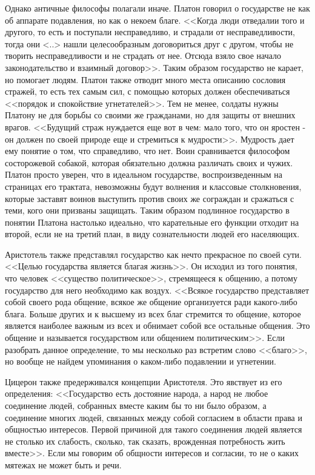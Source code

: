 	Однако античные философы полагали иначе. Платон говорил о государстве 
	не как об аппарате подавления, но как о некоем благе. <<Когда люди 
	отведалии того и другого, то есть и поступали несправедливо, и 
	страдали от несправедливости, тогда они <..> нашли целесообразным 
	договориться друг с другом, чтобы не творить несправедливости и не 
	страдать от нее. Отсюда взяло свое начало законодательство и взаимный 
	договор>>. Таким образом государство не карает, но помогает людям. 
	Платон также отводит много места описанию сословия стражей, то есть 
	тех самым сил, с помощью которых должен обеспечиваться <<порядок и 
	спокойствие угнетателей>>. Тем не менее, солдаты нужны Платону не для 
	борьбы со своими же гражданами, но для защиты от внешних врагов. 
	<<Будущий страж нуждается еще вот в чем: мало того, что он яростен - 
	он должен по своей природе еще и стремиться к мудрости>>. Мудрость дает 
	ему понятие о том, что справедливо, что нет. Воин сравнивается философом 
	состорожевой собакой, которая обязательно должна различать своих и чужих. 
	Платон просто уверен, что в идеальном государстве, воспроизведенным на 
	страницах его трактата, невозможны будут волнения и классовые 
	столкновения, которые заставят воинов выступить против своих же сограждан 
	и сражаться с теми, кого они призваны защищать. Таким образом подлинное 
	государство в понятии Платона настолько идеально, что карательные его 
	функции отходит на второй, если не на третий план, в виду сознательности 
	людей его населяющих.

	Аристотель также представлял государство как нечто прекрасное по своей 
	сути. <<Целью государства является благая жизнь>>. Он исходил из того 
	понятия, что человек <<существо политическое>>, стремящееся к общению, а 
	потому государство для него необходимо как воздух. <<Всякое государство 
	представляет собой своего рода общение, всякое же общение организуется 
	ради какого-либо блага. Больше других и к высшему из всех благ стремится 
	то общение, которое является наиболее важным из всех и обнимает собой все 
	остальные общения. Это общение и называется государством или общением 
	политическим>>. Если разобрать данное определение, то мы несколько раз 
	встретим слово <<благо>>, но вообще не найдем упоминания о каком-либо 
	подавлении и угнетении. 

	Цицерон также предерживался концепции Аристотеля. Это явствует из его 
	определения: <<Государство есть достояние народа, а народ не любое 
	соединение людей, собранных вместе каким бы то ни было образом, а 
	соединение многих людей, связанных между собой согласием в области права 
	и общностью интересов. Первой причиной для такого соединения людей 
	является не столько их слабость, сколько, так сказать, врожденная 
	потребность жить вместе>>. Если мы говорим об общности интересов и 
	согласии, то не о каких мятежах не может быть и речи.

